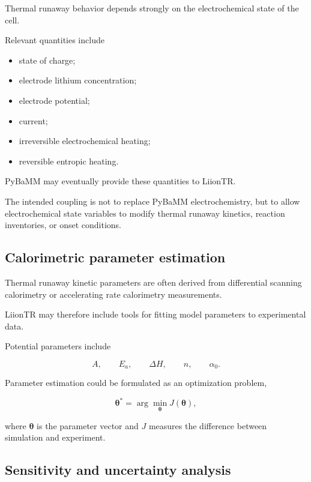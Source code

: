 Thermal runaway behavior depends strongly on the electrochemical state
of the cell.

Relevant quantities include

\begin{itemize}
    \item state of charge;
    \item electrode lithium concentration;
    \item electrode potential;
    \item current;
    \item irreversible electrochemical heating;
    \item reversible entropic heating.
\end{itemize}

PyBaMM may eventually provide these quantities to LiionTR.

The intended coupling is not to replace PyBaMM electrochemistry, but to
allow electrochemical state variables to modify thermal runaway kinetics,
reaction inventories, or onset conditions.


\subsection{Calorimetric parameter estimation}

Thermal runaway kinetic parameters are often derived from differential
scanning calorimetry or accelerating rate calorimetry measurements.

LiionTR may therefore include tools for fitting model parameters to
experimental data.

Potential parameters include

\begin{equation}
    A,
    \qquad
    E_a,
    \qquad
    \Delta H,
    \qquad
    n,
    \qquad
    \alpha_0.
\end{equation}

Parameter estimation could be formulated as an optimization problem,

\begin{equation}
    \boldsymbol{\theta}^{*}
    =
    \arg\min_{\boldsymbol{\theta}}
    J
    \left(
        \boldsymbol{\theta}
    \right),
\end{equation}

where $\boldsymbol{\theta}$ is the parameter vector and $J$ measures the
difference between simulation and experiment.


\subsection{Sensitivity and uncertainty analysis}

